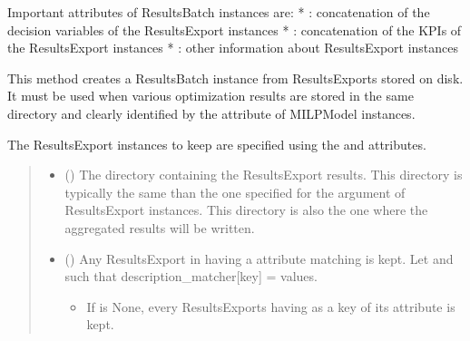 \documentclass[letterpaper,10pt,english]{sphinxmanual}
\begin{document}
\begin{fulllineitems}
\begin{fulllineitems}
\sphinxAtStartPar
Important attributes of ResultsBatch instances are:
*  : concatenation of the decision variables of the ResultsExport instances
*  : concatenation of the KPIs of the ResultsExport instances
*  : other information about ResultsExport instances

\sphinxAtStartPar
This method creates a ResultsBatch instance from ResultsExports stored on disk.
It must be used when various optimization results are stored in the same directory and clearly identified by
the  attribute of MILPModel instances.

\sphinxAtStartPar
The ResultsExport instances to keep are specified using the  and
 attributes.
\begin{quote}\begin{description}
\begin{itemize}
\item {} 
\sphinxAtStartPar
{} () \textendash{} The directory containing the ResultsExport results.
This directory is typically the same than the one specified for the  argument of ResultsExport instances.
This directory is also the one where the aggregated results will be written.

\item {} 
\sphinxAtStartPar
{} (\sphinxstyleliteralemphasis{\sphinxupquote{(}}\sphinxstyleliteralemphasis{\sphinxupquote{ | }}\sphinxstyleliteralemphasis{\sphinxupquote{ | }}\sphinxstyleliteralemphasis{\sphinxupquote{) }}\sphinxstyleliteralemphasis{\sphinxupquote{| }}) \textendash{} 
\sphinxAtStartPar
Any ResultsExport in  having a  attribute matching  is kept.
Let  and  such that description\_matcher{[}key{]} = values.
\begin{itemize}
\item {} 
\sphinxAtStartPar
If  is None, every ResultsExports having  as a key of its  attribute is kept.


\end{itemize}
\end{itemize}
\end{description}
\end{quote}
\end{fulllineitems}
\end{fulllineitems}
\end{document}
